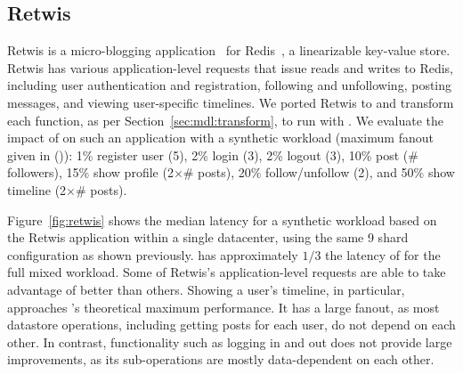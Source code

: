 


\subsection{Retwis}
Retwis is a micro-blogging application~\cite{retwis} for Redis~\cite{redis}, a linearizable key-value store. Retwis has various application-level requests that issue reads and writes to Redis, including user authentication and registration, following and unfollowing, posting messages, and viewing user-specific timelines. We ported Retwis to \mpaxos{} and transform each function, as per Section~\ref{sec:mdl:transform}, to run with \sys{}. We evaluate the impact of \mdl{} on such an application with a synthetic workload (maximum fanout given in ()):
1\% register user (5),
2\% login (3),
2\% logout (3),
10\% post (\# followers),
15\% show profile (2$\times$\# posts),
20\% follow/unfollow (2), and
50\% show timeline (2$\times$\# posts).

Figure~\ref{fig:retwis} shows the median latency for a synthetic workload based on the Retwis application within a single datacenter, using the same 9 shard configuration as shown previously. \sys{} has approximately $1/3$ the latency of \mpaxos{} for the full mixed workload. Some of Retwis's application-level requests are able to take advantage of \Mdl{} better than others. Showing a user's timeline, in particular, approaches \Mdl{}'s theoretical maximum performance. It has a large fanout, as most datastore operations, including getting posts for each user, do not depend on each other. In contrast, functionality such as logging in and out does not provide large improvements, as its sub-operations are mostly data-dependent on each other.

